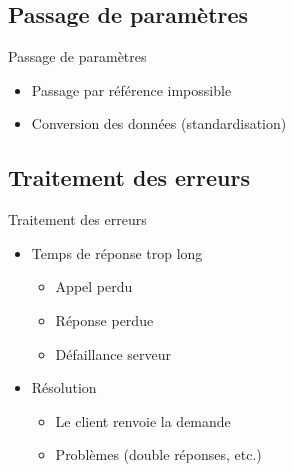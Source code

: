 \begin{frame}{\sectitle}
    \def\subsectitle{Passage de paramètres}
    \subsection{\subsectitle}
    \begin{block}{\subsectitle}
        \begin{itemize}
            \item Passage par référence impossible
            \item Conversion des données (standardisation)
        \end{itemize}
    \end{block}
    \def\subsectitle{Traitement des erreurs}
    \subsection{\subsectitle}
    \begin{block}{\subsectitle}
        \begin{itemize}
            \item Temps de réponse trop long 
                \begin{itemize}
                    \item Appel perdu
                    \item Réponse perdue
                    \item Défaillance serveur
                \end{itemize}
            \item Résolution
                \begin{itemize}
                    \item Le client renvoie la demande
                    \item Problèmes (double réponses, etc.)
                \end{itemize}
        \end{itemize}
    \end{block}
\end{frame}

